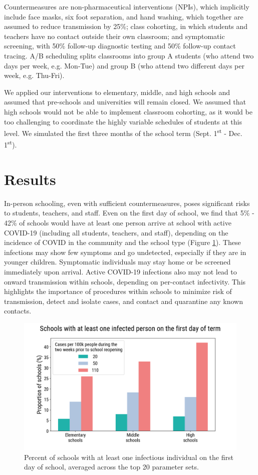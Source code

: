 \documentclass[preprint,12pt]{elsarticle}
\begin{document}
Countermeasures are non-pharmaceutical interventions (NPIs), which implicitly include face masks, six foot separation, and hand washing, which together are assumed to reduce transmission by 25\%; class cohorting, in which students and teachers have no contact outside their own classroom; and symptomatic screening, with 50\% follow-up diagnostic testing and 50\% follow-up contact tracing. A/B scheduling splits classrooms into group A students (who attend two days per week, e.g. Mon-Tue) and group B (who attend two different days per week, e.g. Thu-Fri).

We applied our interventions to elementary, middle, and high schools and assumed that pre-schools and universities will remain closed. We assumed that high schools would not be able to implement classroom cohorting, as it would be too challenging to coordinate the highly variable schedules of students at this level. We simulated the first three months of the school term (Sept. 1\textsuperscript{st} - Dec. 1\textsuperscript{st}).


\section{Results}

In-person schooling, even with sufficient countermeasures, poses significant risks to students, teachers, and staff. Even on the first day of school, we find that 5\% - 42\% of schools would have at least one person arrive at school with active COVID-19 (including all students, teachers, and staff), depending on the incidence of COVID in the community and the school type (Figure \ref{fig:schools_with_a_case}). These infections may show few symptoms and go undetected, especially if they are in younger children. Symptomatic individuals may stay home or be screened immediately upon arrival. Active COVID-19 infections also may not lead to onward transmission within schools, depending on per-contact infectivity. This highlights the importance of procedures within schools to minimize risk of transmission, detect and isolate cases, and contact and quarantine any known contacts. 

\begin{figure}
    \centering
    \includegraphics[scale=0.5]{schools_with_a_case_2020-08-05.png}
    \caption{Percent of schools with at least one infectious individual on the first day of school, averaged across the top 20 parameter sets.}
    \label{fig:schools_with_a_case}
\end{figure}
\end{document}
